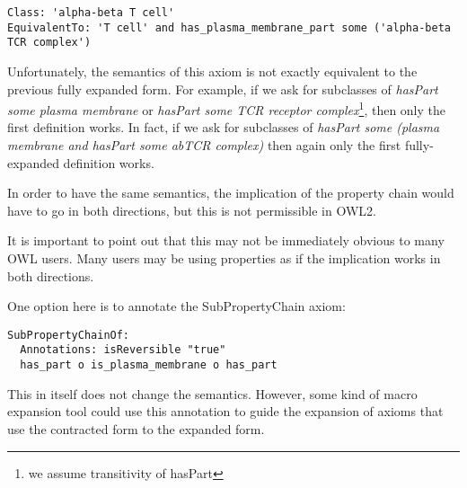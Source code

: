 \documentclass[11pt]{article}
\begin{document}
\begin{verbatim}
Class: 'alpha-beta T cell'
EquivalentTo: 'T cell' and has_plasma_membrane_part some ('alpha-beta TCR complex')
\end{verbatim}

Unfortunately, the semantics of this axiom is not exactly equivalent
to the previous fully expanded form. For example, if we ask for
subclasses of \emph{hasPart some plasma membrane} or \emph{hasPart
  some TCR receptor complex}\footnote{we assume transitivity of
  hasPart}, then only the first definition works. In fact, if we ask
for subclasses of \emph{hasPart some (plasma membrane and hasPart some
  abTCR complex)} then again only the first fully-expanded definition
works.


 In order to have the
same semantics, the implication of the property chain would have to go
in both directions, but this is not permissible in OWL2.


It is important to point out that this may not be immediately obvious
to many OWL users. Many users may be using properties as if the
implication works in both directions.


One option here is to annotate the SubPropertyChain axiom:

\begin{verbatim}
SubPropertyChainOf:
  Annotations: isReversible "true"
  has_part o is_plasma_membrane o has_part
\end{verbatim}

This in itself does not change the semantics. However, some kind of
macro expansion tool could use this annotation to guide the expansion
of axioms that use the contracted form to the expanded form.
\end{document}
